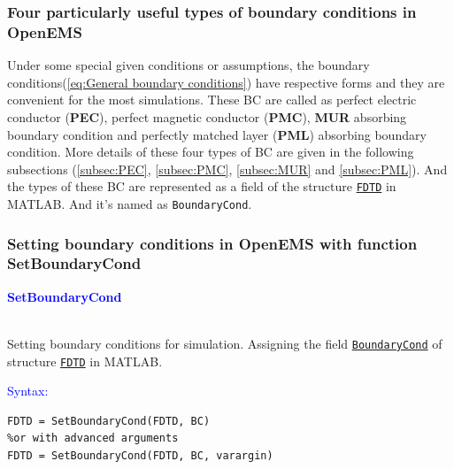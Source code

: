     \subsubsection{Four particularly useful types of boundary conditions in OpenEMS}\label{subsubsec:Four particularly usefull BC}
	Under some special given conditions or assumptions, the boundary conditions(\ref{eq:General boundary conditions}) have  respective forms and they are convenient for the most simulations. These BC are called as perfect electric conductor (\textbf{PEC}), perfect magnetic conductor (\textbf{PMC}), \textbf{MUR} absorbing boundary condition and perfectly matched layer (\textbf{PML}) absorbing boundary condition. More details of these four types of BC are  given in the following subsections (\ref{subsec:PEC}, \ref{subsec:PMC}, \ref{subsec:MUR} and  \ref{subsec:PML}). And the types of these BC are represented as a field of the structure  \hyperref[para:FDTD]{\texttt{FDTD}} in MATLAB. And it's named as \texttt{BoundaryCond}.  \label{para:BoundaryCond}
    \subsubsection{Setting boundary conditions in OpenEMS with function SetBoundaryCond}\label{subsubsec:Setting boundary conditions in OpenEMS with function SetBoundaryCond}
	\textcolor{blue}{\begin{large}\textbf{SetBoundaryCond}	\end{large}}\\
	  Setting boundary conditions for simulation. Assigning the field \hyperref[para:BoundaryCond]{\texttt{BoundaryCond}} of structure \hyperref[para:FDTD]{\texttt{FDTD}}  in MATLAB.

        \textcolor{blue}{\begin{large}Syntax:\end{large}}
 \begin{lstlisting}
FDTD = SetBoundaryCond(FDTD, BC)
%or with advanced arguments
FDTD = SetBoundaryCond(FDTD, BC, varargin)
 \end{lstlisting}


